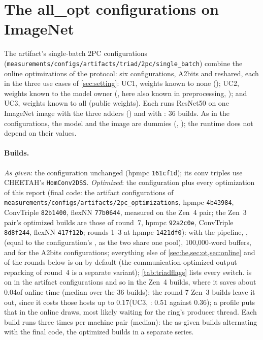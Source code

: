 \section{The all\_opt configurations on ImageNet}\label{sec:triad}

The artifact's single-batch 2PC configurations (\texttt{measurements/configs/artifacts/triad/2pc/single\_batch}) combine
the online optimizations of the protocol: six configurations, A2bits and reshared, each in the three use cases of
\cref{sec:setting}: UC1, weights known to none (); UC2, weights known to the model owner
(, here also known in preprocessing, ); and UC3,
weights known to all (public weights). Each runs ResNet50 on one ImageNet image with the three adders
() and with : 36 builds. As in the configurations, the model and
the image are dummies (, ); the runtime does not depend on their values.

\paragraph{Builds.} \emph{As given}: the configuration unchanged (hpmpc \texttt{161cf1d}); its conv triples use
CHEETAH's \texttt{HomConv2DSS}. \emph{Optimized}: the configuration plus every optimization of this report
(final code: the artifact configurations of \texttt{measurements/configs/artifacts/2pc\_optimizations}, hpmpc
\texttt{4b43984}, ConvTriple \texttt{82b1400}, flexNN \texttt{77b0644}, measured on the Zen~4 pair; the Zen~3 pair's
optimized builds are those of round~7, hpmpc \texttt{92a2c0e}, ConvTriple \texttt{8d8f244}, flexNN \texttt{417f12b}; rounds
1--3 at hpmpc \texttt{1421df0}):  with the pipeline, ,
 (equal to the configuration's , as the two share one
pool), 100,000-word buffers, and  for the A2bits configurations; everything
else of \cref{sec:he,sec:ot,sec:online} and of the rounds below is on by default (the communication-optimized output
repacking of round~4 is a separate variant); \cref{tab:triadflags} lists every switch.  is on in the artifact
configurations and so in the Zen~4 builds, where it saves about 0.04\s of online time (median over the 36 builds); the
round-7 Zen~3 builds leave it out, since it costs those hosts up to 0.17\s (UC3, : 0.51 against
0.36\s); a profile puts that in the online draws, most likely waiting for the ring's producer thread. Each
build runs three times per machine pair (median): the as-given builds alternating with the final code, the optimized
builds in a separate series.

